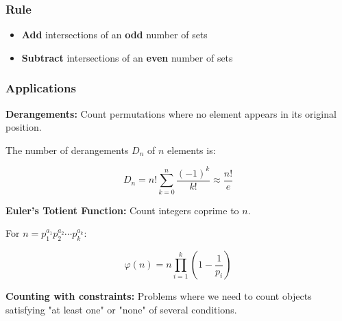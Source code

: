 \subsubsection{Rule}

\begin{itemize}
    \item \textbf{Add} intersections of an \textbf{odd} number of sets
    \item \textbf{Subtract} intersections of an \textbf{even} number of sets
\end{itemize}

\subsubsection{Applications}

\textbf{Derangements:} Count permutations where no element appears in its original position.

The number of derangements $D_n$ of $n$ elements is:

\begin{equation}
    D_n = n! \sum_{k=0}^{n} \frac{(-1)^k}{k!} \approx \frac{n!}{e}
\end{equation}

\textbf{Euler's Totient Function:} Count integers coprime to $n$.

For $n = p_1^{a_1} p_2^{a_2} \cdots p_k^{a_k}$:

\begin{equation}
    \varphi(n) = n \prod_{i=1}^{k} \left(1 - \frac{1}{p_i}\right)
\end{equation}

\textbf{Counting with constraints:} Problems where we need to count objects satisfying "at least one" or "none" of several conditions.
